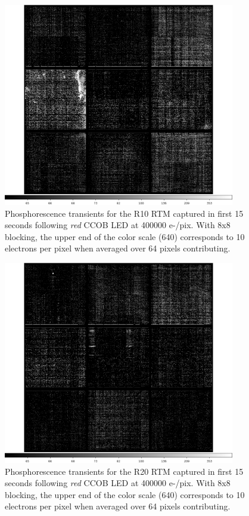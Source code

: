 \begin{figure}[htbp]
\centering
\includegraphics[width=0.9\textwidth]{sections/figures/phosphorescence-survey/itl_fluor_R10_0-19_rb1_log.png}
\caption{Phosphorescence transients for the R10 RTM captured in first 15 seconds following {\it red} CCOB LED at 400000 e-/pix. With 8x8 blocking, the upper end of the color scale (640) corresponds to 10 electrons per pixel when averaged over 64 pixels contributing.}
\label{fig:phos:R10}
\end{figure}

\begin{figure}[htbp]
\centering
\includegraphics[width=0.9\textwidth]{sections/figures/phosphorescence-survey/itl_fluor_R20_0-19_rb1_log.png}
\caption{Phosphorescence transients for the R20 RTM captured in first 15 seconds following {\it red} CCOB LED at 400000 e-/pix. With 8x8 blocking, the upper end of the color scale (640) corresponds to 10 electrons per pixel when averaged over 64 pixels contributing.}
\label{fig:phos:R20}
\end{figure}

